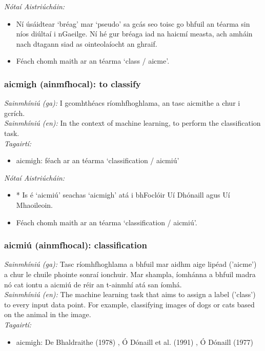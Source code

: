 \documentclass{article}
\begin{document}
 \noindent \textit{Nótaí Aistriúcháin:}
\begin{itemize}
	\item Ní úsáidtear `bréag' mar `pseudo' sa gcás seo toisc go bhfuil an téarma sin níos diúltaí i nGaeilge. Ní hé gur bréaga iad na haicmí measta, ach amháin nach dtagann siad as ointeolaíocht an ghraif.
	\item Féach chomh maith ar an téarma `class / aicme'.
\end{itemize}


\subsubsection*{aicmigh (ainmfhocal): to classify}
 \noindent \textit{Sainmhíniú (ga):} I gcomhthéacs ríomhfhoghlama, an tasc aicmithe a chur i gcrích.
\\
 \noindent \textit{Sainmhíniú (en):} In the context of machine learning, to perform the classification task.
\\
 \noindent \textit{Tagairtí:}
\begin{itemize}
	\item aicmigh: féach ar an téarma `classification / aicmiú'
\end{itemize}

 \noindent \textit{Nótaí Aistriúcháin:}
\begin{itemize}
	\item * Is é `aicmiú' seachas `aicmigh' atá i bhFoclóir Uí Dhónaill agus Uí Mhaoileoin.
	\item Féach chomh maith ar an téarma `classification / aicmiú'.
\end{itemize}


\subsubsection*{aicmiú (ainmfhocal): classification}
 \noindent \textit{Sainmhíniú (ga):} Tasc ríomhfhoghlama a bhfuil mar aidhm aige lipéad ('aicme') a chur le chuile phointe sonraí ionchuir. Mar shampla, íomhánna a bhfuil madra nó cat iontu a aicmiú de réir an t-ainmhí atá san íomhá.
\\
 \noindent \textit{Sainmhíniú (en):} The machine learning task that aims to assign a label ('class') to every input data point. For example, classifying images of dogs or cats based on the animal in the image.
\\
 \noindent \textit{Tagairtí:}
\begin{itemize}
	\item aicmigh: De Bhaldraithe (1978) \cite{de-bhaldraithe}, Ó Dónaill et al. (1991) \cite{focloir-beag}, Ó Dónaill (1977) \cite{odonaill}
\end{itemize}
\end{document}

